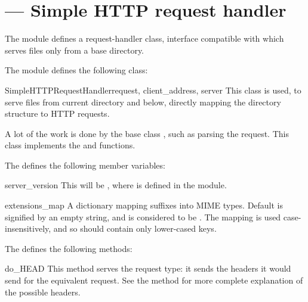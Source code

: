 \section{ ---
         Simple HTTP request handler}



The  module defines a request-handler class,
interface compatible with 
which serves files only from a base directory.

The  module defines the following class:

\begin{classdesc}{SimpleHTTPRequestHandler}{request, client_address, server}
This class is used, to serve files from current directory and below,
directly mapping the directory structure to HTTP requests.

A lot of the work is done by the base class
, such as parsing the
request.  This class implements the  and
 functions.
\end{classdesc}

The  defines the following member
variables:

\begin{memberdesc}{server_version}
This will be , where 
is defined in the module.
\end{memberdesc}

\begin{memberdesc}{extensions_map}
A dictionary mapping suffixes into MIME types. Default is signified
by an empty string, and is considered to be .
The mapping is used case-insensitively, and so should contain only
lower-cased keys.
\end{memberdesc}

The  defines the following methods:

\begin{methoddesc}{do_HEAD}{}
This method serves the  request type: it sends the
headers it would send for the equivalent  request. See the
 method for more complete explanation of the possible
headers.
\end{methoddesc}

